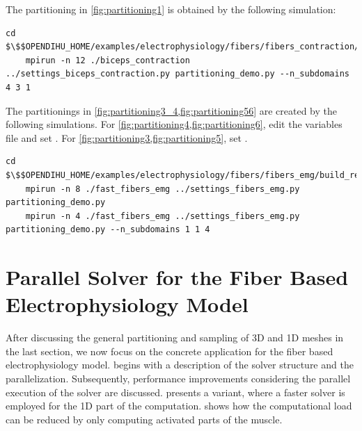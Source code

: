 \begin{reproduce_no_break}
  The partitioning in \cref{fig:partitioning1} is obtained by the following simulation:
  \begin{lstlisting}[columns=fullflexible,breaklines=true,postbreak=\mbox{\textcolor{gray}{$\hookrightarrow$}\space}]
    cd $\$$OPENDIHU_HOME/examples/electrophysiology/fibers/fibers_contraction/no_precice/build_release
    mpirun -n 12 ./biceps_contraction ../settings_biceps_contraction.py partitioning_demo.py --n_subdomains 4 3 1
  \end{lstlisting}
  The partitionings in \cref{fig:partitioning3_4,fig:partitioning56} are created by the following simulations. For \cref{fig:partitioning4,fig:partitioning6}, edit the variables file  and set . For \cref{fig:partitioning3,fig:partitioning5}, set .
  \begin{lstlisting}[columns=fullflexible,breaklines=true,postbreak=\mbox{\textcolor{gray}{$\hookrightarrow$}\space}]
    cd $\$$OPENDIHU_HOME/examples/electrophysiology/fibers/fibers_emg/build_release
    mpirun -n 8 ./fast_fibers_emg ../settings_fibers_emg.py partitioning_demo.py
    mpirun -n 4 ./fast_fibers_emg ../settings_fibers_emg.py partitioning_demo.py --n_subdomains 1 1 4
  \end{lstlisting}
\end{reproduce_no_break}


\section{Parallel Solver for the Fiber Based Electrophysiology Model}\label{sec:parallel_partitioning_for_fiber_based}

After discussing the general partitioning and sampling of 3D and 1D meshes in the last section, we now focus on the concrete application for the fiber based electrophysiology model.
 begins with a description of the solver structure and the parallelization. Subsequently, performance improvements considering the parallel execution of the solver are discussed.  presents a variant, where a faster solver is employed for the 1D part of the computation.  shows how the computational load can be reduced by only computing activated parts of the muscle.

